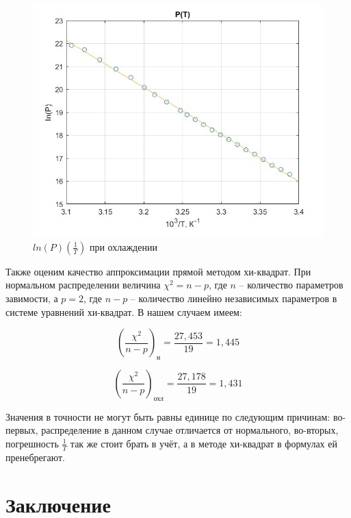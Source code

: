 \documentclass[a4paper, 12pt]{article} %
\begin{document}
\begin{figure}
    \begin{center}
        \includegraphics[scale = 0.74]{xgraph2}
        \caption{$ln(P)(\frac{1}{T})$ при охлаждении}
    \end{center}
\end{figure}

Также оценим качество аппроксимации прямой методом хи-квадрат. При нормальном распределении величина $\chi^2 = n - p$, где $n$ -- количество параметров завимости, а $p = 2$, где $n - p$ -- количество линейно независимых параметров в системе уравнений хи-квадрат. В нашем случаем имеем:

\begin{equation}
    \left( \frac{\chi^2}{n - p}\right)_{\text{н}} = \frac{27,453}{19} = 1,445
\end{equation}

\begin{equation}
    \left( \frac{\chi^2}{n - p}\right)_{\text{охл}} = \frac{27,178}{19} = 1,431
\end{equation}

Значения в точности не могут быть равны единице по следующим причинам: во-первых, распределение в данном случае отличается от нормального, во-вторых, погрешность $\frac{1}{T}$ так же стоит брать в учёт, а в методе хи-квадрат в формулах ей пренебрегают.


\section{Заключение}
\end{document}
